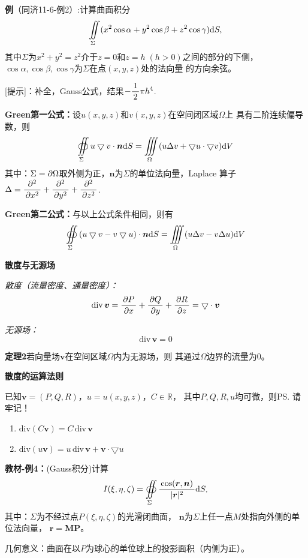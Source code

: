 {\bf 例}（同济11-6-例2）:计算曲面积分
$$\iint\limits_{\Sigma}(x^2\cos\alpha+y^2\cos\beta
+z^2\cos\gamma)\mathrm{d} S,$$
其中$\Sigma$为$x^2+y^2=z^2$介于$z=0$和$z=h\;(h>0)$之间的部分的下侧，
$\cos\alpha,\cos\beta,\cos\gamma$为$\Sigma$在点$(x,y,z)$处的法向量
的方向余弦。

[提示]：补全，Gauss公式，结果$-\displaystyle\frac{\,{1}\,}{\,{2}\,}\pi h^4$.

\begin{shaded}
	{\bf Green第一公式：}设$u(x,y,z)$和$v(x,y,z)$在空间闭区域$\Omega$上
	具有二阶连续偏导数，则
	$$
	\oiint\limits_{\Sigma}u\bigtriangledown v\cdot\bm{n}\mathrm{d} S
	=\iiint\limits_{\Omega}(u\Delta v
	+\bigtriangledown u\cdot\bigtriangledown v)\mathrm{d} V
	$$ 
	其中：$\Sigma=\partial\Omega$取外侧为正，$\bm{n}$为$\Sigma$的单位法向量，Laplace
	算子$\Delta=\displaystyle\frac{\,{\partial^2}\,}{\,{\partial x^2}\,}+\displaystyle\frac{\,{\partial^2}\,}{\,{\partial y^2}\,}+\displaystyle\frac{\,{\partial^2}\,}{\,{\partial z^2}\,}$.
		
	{\bf Green第二公式：}与以上公式条件相同，则有
	$$
	\oiint\limits_{\Sigma}\left(u\bigtriangledown v
	-v\bigtriangledown u\right)\cdot\bm{n}\mathrm{d} S=
	\iiint\limits_{\Omega}(u\Delta v-v\Delta u)\mathrm{d} V
	$$
\end{shaded}



{\bf 散度与无源场}

{\it 散度（流量密度、通量密度）：}
$$\mathrm{div}\,\bm{v}=\displaystyle\frac{\,{\partial P}\,}{\,{\partial x}\,}+\displaystyle\frac{\,{\partial Q}\,}{\,{\partial y}\,}+\displaystyle\frac{\,{\partial R}\,}{\,{\partial
z}\,}=\bigtriangledown\cdot\bm{v}$$ 

{\it 无源场：}
$${\mathrm{div}\,\bm{v}=0}$$ 

{\bf 定理2}若向量场$\bm{v}$在空间区域$\Omega$内为无源场，则
其通过$\Omega$边界的流量为$0$。

{\bf 散度的运算法则}

已知$\bm{v}=(P,Q,R)$，$u=u(x,y,z)$，$C\in\mathbb{R}$， 
其中$P,Q,R,u$均可微，则\ps{请牢记！}
\begin{enumerate}[(1)]
  \setlength{\itemindent}{1cm}
  \item ${\mathrm{div}(C\bm{v}) =C\,\mathrm{div}\,\bm{v}}$ 
  \item ${\mathrm{div}(u\bm{v}) =u\,\mathrm{div}\,\bm{v}
  +\bm{v}\cdot\bigtriangledown u}$
\end{enumerate}

{\bf 教材-例4：}(Gauss积分)计算
$$I(\xi,\eta,\zeta)=\oiint\limits_{\Sigma}
\displaystyle\frac{\,{\cos(\bm{r},\bm{n})}\,}{\,{|\bm{r}|^2}\,}\mathrm{d} S,$$
其中：$\Sigma$为不经过点$P(\xi,\eta,\zeta)$的光滑闭曲面，
$\bm{n}$为$\Sigma$上任一点$M$处指向外侧的单位法向量，
$\bm{r}=\bm{MP}$。

几何意义：曲面在以$P$为球心的单位球上的投影面积（内侧为正）。

